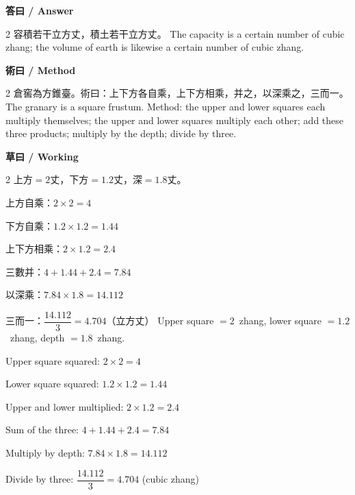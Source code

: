 \documentclass[11pt,a4paper]{article}
\begin{document}
\vspace{0.4em}
\noindent\textbf{\textcolor{chinesecolor}{答曰} / \textcolor{englishcolor}{Answer}}
\vspace{0.2em}
\begin{paracol}{2}
容積若干立方丈，積土若干立方丈。
\switchcolumn
The capacity is a certain number of cubic zhang; the volume of earth is
likewise a certain number of cubic zhang.
\end{paracol}

\vspace{0.4em}
\noindent\textbf{\textcolor{chinesecolor}{術曰} / \textcolor{englishcolor}{Method}}
\vspace{0.2em}
\begin{paracol}{2}
倉窖為方錐臺。術曰：上下方各自乘，上下方相乘，并之，以深乘之，三而一。
\switchcolumn
The granary is a square frustum. Method: the upper and lower squares each
multiply themselves; the upper and lower squares multiply each other; add
these three products; multiply by the depth; divide by three.
\end{paracol}

\vspace{0.4em}
\noindent\textbf{\textcolor{chinesecolor}{草曰} / \textcolor{englishcolor}{Working}}
\vspace{0.2em}
\begin{paracol}{2}
上方$=2$丈，下方$=1.2$丈，深$=1.8$丈。

上方自乘：$2 \times 2 = 4$

下方自乘：$1.2 \times 1.2 = 1.44$

上下方相乘：$2 \times 1.2 = 2.4$

三數并：$4 + 1.44 + 2.4 = 7.84$

以深乘：$7.84 \times 1.8 = 14.112$

三而一：$\dfrac{14.112}{3} = 4.704$（立方丈）
\switchcolumn
Upper square $= 2$~zhang, lower square $= 1.2$~zhang, depth $= 1.8$~zhang.

Upper square squared: $2 \times 2 = 4$

Lower square squared: $1.2 \times 1.2 = 1.44$

Upper and lower multiplied: $2 \times 1.2 = 2.4$

Sum of the three: $4 + 1.44 + 2.4 = 7.84$

Multiply by depth: $7.84 \times 1.8 = 14.112$

Divide by three: $\dfrac{14.112}{3} = 4.704$ (cubic zhang)
\end{paracol}
\end{document}
